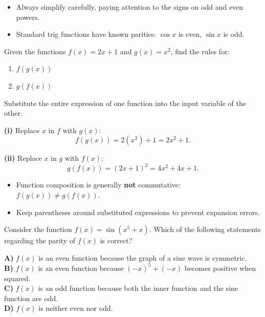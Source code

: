 \begin{takeaways}
\begin{itemize}[leftmargin=*]
\item Always simplify carefully, paying attention to the signs on odd and even powers.
\item Standard trig functions have known parities: $\cos x$ is even, $\sin x$ is odd.
\end{itemize}
\end{takeaways}

\begin{problem}
Given the functions $f(x) = 2x+1$ and $g(x) = x^2$, find the rules for:
\begin{enumerate}[label=(\roman*)]
\item $f(g(x))$
\item $g(f(x))$
\end{enumerate}
\end{problem}

\begin{hint}
Substitute the entire expression of one function into the input variable of the other.
\end{hint}

\begin{solution}
\textbf{(i)} Replace $x$ in $f$ with $g(x)$:
\[ f(g(x)) = 2(x^2) + 1 = \boxed{2x^2+1}. \]

\textbf{(ii)} Replace $x$ in $g$ with $f(x)$:
\[ g(f(x)) = (2x+1)^2 = \boxed{4x^2+4x+1}. \]
\end{solution}

\begin{takeaways}
\begin{itemize}[leftmargin=*]
\item Function composition is generally \textbf{not} commutative: $f(g(x)) \neq g(f(x))$.
\item Keep parentheses around substituted expressions to prevent expansion errors.
\end{itemize}
\end{takeaways}


\begin{problem}
Consider the function $f(x) = \sin(x^5 + x)$. Which of the following statements regarding the parity of $f(x)$ is correct?

\textbf{A)} $f(x)$ is an even function because the graph of a sine wave is symmetric. \\
\textbf{B)} $f(x)$ is an even function because $(-x)^5 + (-x)$ becomes positive when squared. \\
\textbf{C)} $f(x)$ is an odd function because both the inner function and the sine function are odd. \\
\textbf{D)} $f(x)$ is neither even nor odd.
\end{problem}

